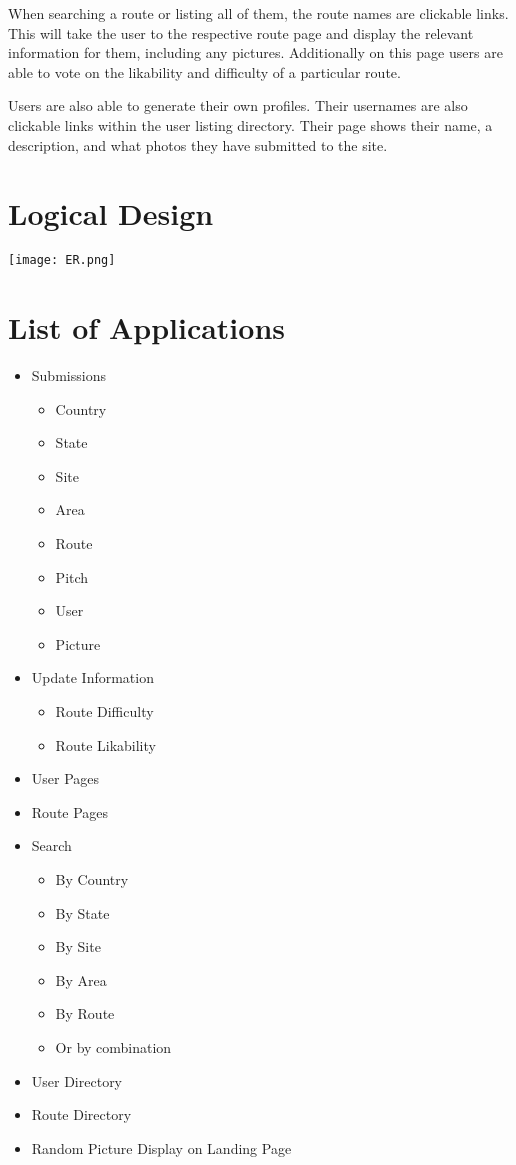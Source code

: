 \documentclass[12pt,letter]{article}
\begin{document}
When searching a route or listing all of them, the route names are clickable
links. This will take the user to the respective route page and display the
relevant information for them, including any pictures. Additionally on this page
users are able to vote on the likability and difficulty of a particular route.

Users are also able to generate their own profiles. Their usernames are also
clickable links within the user listing directory. Their page shows their name,
a description, and what photos they have submitted to the site. 

\section{Logical Design}
\texttt{[image: ER.png]}

\section{List of Applications}

\begin{itemize}
    \item Submissions
        \begin{itemize}
            \item Country
            \item State
            \item Site
            \item Area
            \item Route
            \item Pitch
            \item User
            \item Picture
        \end{itemize}
    \item Update Information
        \begin{itemize}
            \item Route Difficulty
            \item Route Likability
        \end{itemize}
    \item User Pages
    \item Route Pages
    \item Search
        \begin{itemize}
            \item By Country
            \item By State
            \item By Site
            \item By Area
            \item By Route
            \item Or by combination
        \end{itemize}
    \item User Directory
    \item Route Directory
    \item Random Picture Display on Landing Page
\end{itemize}
\end{document}
